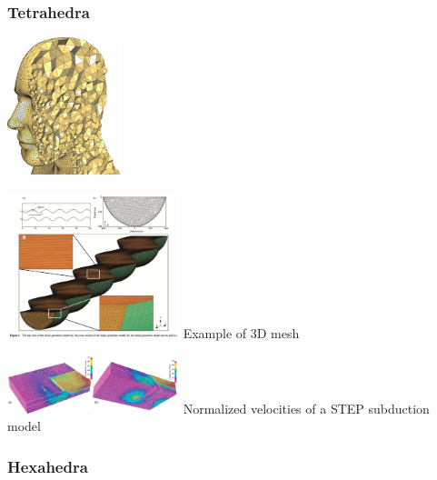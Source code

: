 \Literature \cite{musd15}\cite{vemm09}






\subsubsection{Tetrahedra}

\begin{center}
\includegraphics[height=4cm]{images/meshes/tetra}\\
\end{center}

\begin{center}
\includegraphics[width=5cm]{images/meshes/glacier}
{\small Example of 3D mesh \cite{yash15}  }
\end{center}

\begin{center}
\includegraphics[width=5cm]{images/meshes/gowo05}
{\small Normalized velocities of a STEP subduction model \cite{gowo05}  }
\end{center}


\subsubsection{Hexahedra}

